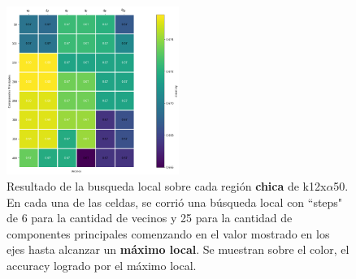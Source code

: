 \begin{figure}[h]
  \includegraphics[width=0.5\textwidth]{./img/pca_big_ext.png}
  \centering
  \caption{Resultado de la busqueda local sobre cada región
    \textbf{chica} de k12x$\alpha$50. En cada una de las celdas, se corrió
    una búsqueda local con ``steps" de 6 para la cantidad de vecinos y 25 para la cantidad de componentes principales comenzando en el valor mostrado en los ejes
    hasta alcanzar un \textbf{máximo local}. Se muestran sobre el color, el accuracy logrado
    por el máximo local.}
    \label{fig:pca-small}
\end{figure}
